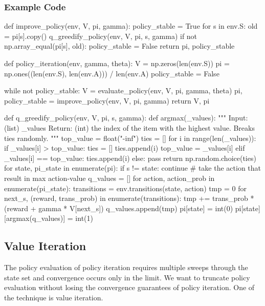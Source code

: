 \documentclass[lang=en,mode=geye,device=normal,color=blue,14pt]{elegantnote}
\DeclareMathOperator*{\1}{\mathbbm{1}}
\begin{document}
\subsubsection{Example Code}
\begin{python}
def improve_policy(env, V, pi, gamma):
    policy_stable = True
    for s in env.S:
        old = pi[s].copy()
        q_greedify_policy(env, V, pi, s, gamma)
        if not np.array_equal(pi[s], old):
            policy_stable = False
    return pi, policy_stable

def policy_iteration(env, gamma, theta):
    V = np.zeros(len(env.S))
    pi = np.ones((len(env.S), len(env.A))) / len(env.A)
    policy_stable = False
    
    while not policy_stable:
        V = evaluate_policy(env, V, pi, gamma, theta)
        pi, policy_stable = improve_policy(env, V, pi, gamma)
    return V, pi
    
def q_greedify_policy(env, V, pi, s, gamma):
    def argmax(_values):
        """
        Input:  (list) _values
        Return: (int)  the index of the item with the highest value.
        Breaks ties randomly.
        """
        top_value = float("-inf")
        ties = []
        for i in range(len(_values)):
            if _values[i] > top_value:
                ties = []
                ties.append(i)
                top_value = _values[i]
            elif _values[i] == top_value:
                ties.append(i)
            else:
                pass
        return np.random.choice(ties)
    for state, pi_state in enumerate(pi):
        if s != state:
            continue
        # take the action that result in max action-value
        q_values = []
        for action, action_prob in enumerate(pi_state):
            transitions = env.transitions(state, action)
            tmp = 0
            for next_s, (reward, trans_prob) in enumerate(transitions):
                tmp += trans_prob * (reward + gamma * V[next_s])
            q_values.append(tmp)
        pi[state] = int(0)
        pi[state][argmax(q_values)] = int(1)
\end{python}

\subsection{Value Iteration}

The policy evaluation of policy iteration requires multiple sweeps through the state set and convergence occurs only in the limit.
We want to truncate policy evaluation without losing the convergence guarantees of policy iteration. One of the technique is value iteration.
\end{document}
